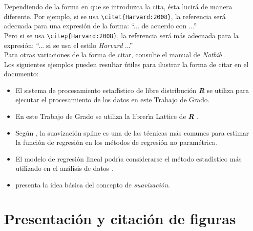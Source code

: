 Dependiendo de la forma en que se introduzca la cita, \'{e}sta lucir\'{a} de manera diferente. Por ejemplo, si se usa
\verb"\citet{Harvard:2008}", la referencia ser\'{a}  adecuada para una expresi\'{o}n de la forma: ``... de acuerdo con \citet{Harvard:2008}...'' \\

Pero si se usa
\verb"\citep{Harvard:2008}", la referencia ser\'{a} m\'{a}s adecuada para la expresi\'{o}n: ``... si se usa el estilo \emph{Harvard} \citep{Harvard:2008}...'' \\

Para otras variaciones de la forma de citar, consulte el manual de \emph{Natbib} \citep{Natbib:2010}. \\

Los siguientes ejemplos pueden resultar \'{u}tiles para ilustrar la forma de citar en el documento:

\begin{itemize}

\item El sistema de procesamiento estad\'{\i}stico de libre distribuci\'{o}n \emph{\textbf{R}} \citep{R} se utiliza para ejecutar el procesamiento de los datos en este Trabajo de Grado.

\item En este Trabajo de Grado se utiliza la librer\'{\i}a Lattice de \emph{\textbf{R}} \citep[ver][]{Sarkar:2008}.

\item Seg\'{u}n \citet{Wood:2003}, la suavizaci\'{o}n spline es una de las t\'{e}cnicas m\'{a}s comunes para estimar la funci\'{o}n de regresi\'{o}n en los m\'{e}todos de regresi\'{o}n no param\'{e}trica.

\item El modelo de regresi\'{o}n lineal podr\'{\i}a considerarse el m\'{e}todo estad\'{\i}stico m\'{a}s utilizado en el an\'{a}lisis de datos \citep{Graybill:1976, Draper:Smith:1998, Neter:1990, Seber:1977, Searle:1971}.

\item \citet[p\'{a}g. 12]{Eubank:1999} presenta la idea b\'{a}sica del concepto de  \emph{suavizaci\'{o}n}.

\end{itemize}

\section{Presentaci\'{o}n y citaci\'{o}n de figuras}

